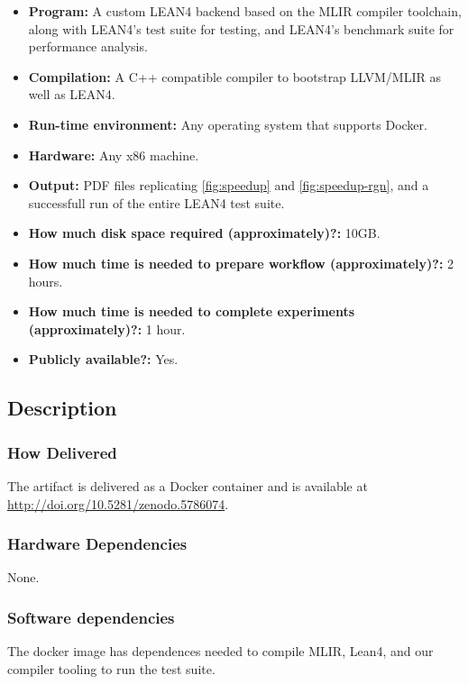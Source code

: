 \documentclass[conference]{IEEEtran}
\begin{document}
{\small
\begin{itemize}
  \item {\bf Program: }A custom LEAN4 backend based on the MLIR compiler
    toolchain, along with LEAN4's test suite for testing, and LEAN4's benchmark suite for
    performance analysis.
  \item {\bf Compilation: }A C++ compatible compiler to bootstrap LLVM/MLIR as well as LEAN4.
  \item {\bf Run-time environment: }Any operating system that supports Docker.
  \item {\bf Hardware: }Any x86 machine.
  \item {\bf Output: }PDF files replicating \autoref{fig:speedup} and \autoref{fig:speedup-rgn}, and a successfull
    run of the entire LEAN4 test suite.
  \item {\bf How much disk space required (approximately)?: }10GB.
  \item {\bf How much time is needed to prepare workflow (approximately)?: }2 hours.
  \item {\bf How much time is needed to complete experiments (approximately)?: }1 hour.
  \item {\bf Publicly available?: }Yes.
\end{itemize}

\subsection{Description}

\subsubsection{How Delivered}
The artifact is delivered as a Docker container
and is available at \url{http://doi.org/10.5281/zenodo.5786074}.

\subsubsection{Hardware Dependencies}
None.

\subsubsection{Software dependencies}
The docker image has dependences needed to compile MLIR, Lean4, and our
compiler tooling to run the test suite.

}
\end{document}
